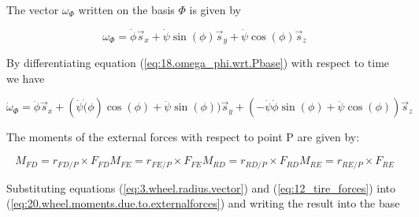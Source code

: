 \documentclass[sublist,a4paper,twoside,11pt]{article}
\begin{document}
The vector $\omega_\Phi$ written on the basis $\Phi$ is given by	

\begin{equation}	\label{eq:18.omega_phi.wrt.Pbase}
\omega_\Phi = \dot{\phi}\vec{s}_x + \dot{\psi}\sin(\phi)\vec{s}_y + \dot{\psi}\cos(\phi)\vec{s}_z
\end{equation}

By differentiating equation (\ref{eq:18.omega_phi.wrt.Pbase}) with respect to time we have

\begin{equation}
\label{eq:19.dot_omega_phi.vector}
\dot{\omega}_\Phi = \ddot{\phi}\vec{s}_x + (\dot{\psi}\dot(\phi)\cos(\phi) + \ddot{\psi}\sin(\phi)) \vec{s}_y + 
(-\dot{\psi}\dot{\phi}\sin(\phi) + \ddot{\psi}\cos(\phi))\vec{s}_z
\end{equation}

The moments of the external forces with respect to point P are given by:

\begin{subequations}
		\label{eq:20.wheel.moments.due.to.externalforces}
	\begin{equation}
	M_{FD} = r_{FD/P} \times F_{FD}
	\end{equation}
	\begin{equation}
	M_{FE} = r_{FE/P} \times F_{FE}
	\end{equation}
	\begin{equation}
	M_{RD} = r_{RD/P} \times F_{RD}
	\end{equation}
	\begin{equation}
	M_{RE} = r_{RE/P} \times F_{RE}
	\end{equation}
\end{subequations}


Substituting equations (\ref{eq:3.wheel.radius.vector}) and (\ref{eq:12_tire_forces}) into (\ref{eq:20.wheel.moments.due.to.externalforces}) and writing the result into the base
\end{document}
